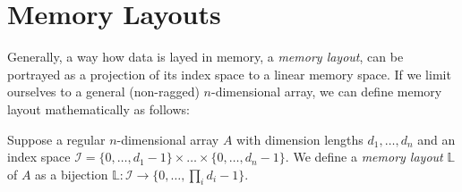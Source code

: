 \section{Memory Layouts}





Generally, a way how data is layed in memory, a \emph{memory layout}, can be portrayed as a projection of its index space to a linear memory space. If we limit ourselves to a general (non-ragged) $n$-dimensional array, we can define memory layout mathematically as follows:

\begin{defn}
  Suppose a regular $n$-dimensional array $A$ with dimension lengths $d_1, \dots, d_n$ and an index space $\mathcal{I} = \{0,\dots,d_1 - 1\}\times \dots \times \{0,\dots,d_n - 1\}$. We define a \emph{memory layout} $\mathbb{L}$ of $A$ as a bijection $\mathbb{L}: \mathcal{I} \to \{0,\dots, \prod_{i}d_i - 1\}$. 
\end{defn}

